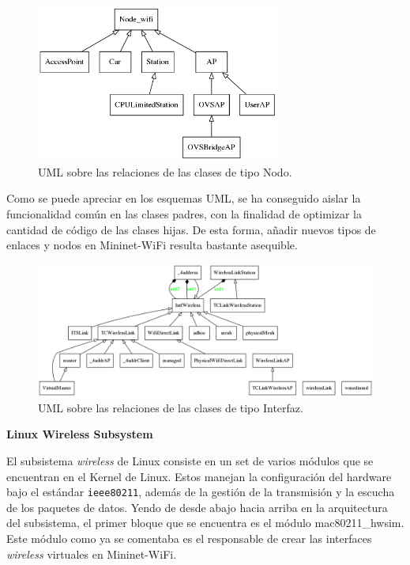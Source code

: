 \begin{figure}[ht]
    \centering
    \includegraphics[width=8cm]{archivos/img/dev/p4-wifi/analysis/uml_node.png}
    \caption{UML sobre las relaciones de las clases de tipo Nodo.}
    \label{fig:analysis_p4_wifi_4}
\end{figure}



Como se puede apreciar en los esquemas UML, se ha conseguido aislar la funcionalidad común en las clases padres, con la finalidad de optimizar la cantidad de código de las clases hijas. De esta forma, añadir nuevos tipos de enlaces y nodos en Mininet-WiFi resulta bastante asequible.\\
\par

\begin{figure}[ht]
    \centering
    \includegraphics[width=15cm]{archivos/img/dev/p4-wifi/analysis/uml_link.png}
    \caption{UML sobre las relaciones de las clases de tipo Interfaz.}
    \label{fig:analysis_p4_wifi_5}
\end{figure}



\vspace{1cm}
\textbf{Linux Wireless Subsystem}\\
\par

El subsistema \textit{wireless} de Linux consiste en un set de varios módulos que se encuentran en el Kernel de Linux. Estos manejan la configuración del hardware bajo el estándar \texttt{ieee80211}, además de la gestión de la transmisión y la escucha de los paquetes de datos. Yendo de desde abajo hacia arriba en la arquitectura del subsistema, el primer bloque que se encuentra es el módulo mac80211\_hwsim. Este módulo como ya se comentaba es el responsable de crear las interfaces \textit{wireless} virtuales en Mininet-WiFi.\\
\par

